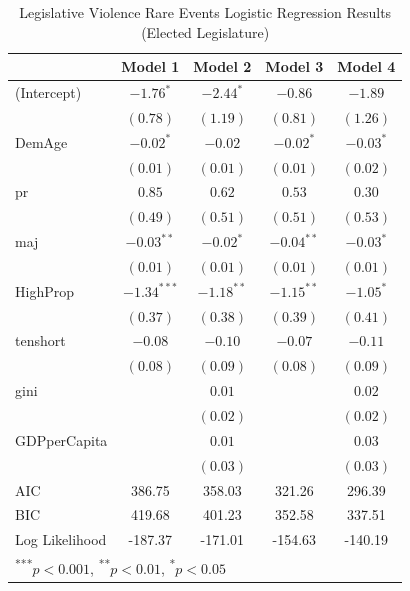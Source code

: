 \documentclass[a4paper]{article}\usepackage{graphicx, color}
\begin{document}
\begin{table}
\caption{Legislative Violence Rare Events Logistic Regression Results (Elected Legislature)}
\label{outputTable.dem}
\begin{center}

\begin{tabular}{l c c c c }
\hline
               & Model 1 & Model 2 & Model 3 & Model 4 \\
\hline
(Intercept)    & $-1.76^{*}$   & $-2.44^{*}$  & $-0.86$      & $-1.89$     \\
               & $(0.78)$      & $(1.19)$     & $(0.81)$     & $(1.26)$    \\
DemAge         & $-0.02^{*}$   & $-0.02$      & $-0.02^{*}$  & $-0.03^{*}$ \\
               & $(0.01)$      & $(0.01)$     & $(0.01)$     & $(0.02)$    \\
pr             & $0.85$        & $0.62$       & $0.53$       & $0.30$      \\
               & $(0.49)$      & $(0.51)$     & $(0.51)$     & $(0.53)$    \\
maj            & $-0.03^{**}$  & $-0.02^{*}$  & $-0.04^{**}$ & $-0.03^{*}$ \\
               & $(0.01)$      & $(0.01)$     & $(0.01)$     & $(0.01)$    \\
HighProp       & $-1.34^{***}$ & $-1.18^{**}$ & $-1.15^{**}$ & $-1.05^{*}$ \\
               & $(0.37)$      & $(0.38)$     & $(0.39)$     & $(0.41)$    \\
tenshort       & $-0.08$       & $-0.10$      & $-0.07$      & $-0.11$     \\
               & $(0.08)$      & $(0.09)$     & $(0.08)$     & $(0.09)$    \\
gini           &               & $0.01$       &              & $0.02$      \\
               &               & $(0.02)$     &              & $(0.02)$    \\
GDPperCapita   &               & $0.01$       &              & $0.03$      \\
               &               & $(0.03)$     &              & $(0.03)$    \\
\hline
AIC            & 386.75        & 358.03       & 321.26       & 296.39      \\
BIC            & 419.68        & 401.23       & 352.58       & 337.51      \\
Log Likelihood & -187.37       & -171.01      & -154.63      & -140.19     \\
\hline
\multicolumn{5}{l}{\scriptsize{\textsuperscript{***}$p<0.001$, 
  \textsuperscript{**}$p<0.01$, 
  \textsuperscript{*}$p<0.05$}}
\end{tabular}



\end{center}
\end{table}
\end{document}
